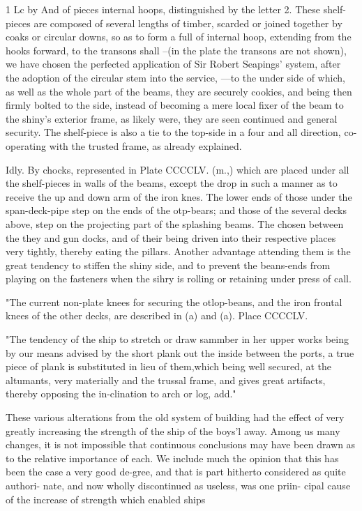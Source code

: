 1 Lc by And of pieces internal hoops, distinguished by the letter 2. These shelf-pieces are composed of several lengths of timber, scarded or joined together by coaks or circular downs, so as to form a full of internal hoop, extending from the hooks forward, to the transons shall --(in the plate the transons are not shown), we have chosen the perfected application of Sir Robert Seapings’ system, after the adoption of the circular stem into the service, —to the under side of which, as well as the whole part of the beams, they are securely cookies, and being then firmly bolted to the side, instead of becoming a mere local fixer of the beam to the shiny’s exterior frame, as likely were, they are seen continued and general security. The shelf-piece is also a tie to the top-side in a four and all direction, co-operating with the trusted frame, as already explained.\par{} Idly. By chocks, represented in Plate CCCCLV. (m.,) which are placed under all the shelf-pieces in walls of the beams, except the drop in such a manner as to receive the up and down arm of the iron knes. The lower ends of those under the span-deck-pipe step on the ends of the otp-bears; and those of the several decks above, step on the projecting part of the splashing beams. The chosen between the they and gun docks, and of their being driven into their respective places very tightly, thereby eating the pillars. Another advantage attending them is the great tendency to stiffen the shiny side, and to prevent the beans-ends from playing on the fasteners when the sihry is rolling or retaining under press of call.\par\medskip
"The current non-plate knees for securing the otlop-beans, and the iron frontal knees of the other decks, are described in (a) and (a). Place CCCCLV.\par\medskip
"The tendency of the ship to stretch or draw sammber in her upper works being by our means advised by the short plank out the inside between the ports, a true piece of plank is substituted in lieu of them,which being well secured, at the altumants, very materially and the trussal frame, and gives great artifacts, thereby opposing the in-clination to arch or log, add."\par\medskip
These various alterations from the old system of building had the effect of very greatly increasing the strength of the ship of the boys'l away. Among us many changes, it is not impossible that continuous conclusions may have been drawn as to the relative importance of each. We include much the opinion that this has been the case a very good de-gree, and that is part hitherto considered as quite authori- nate, and now wholly discontinued as useless, was one priin- cipal cause of the increase of strength which enabled ships\par\medskip
